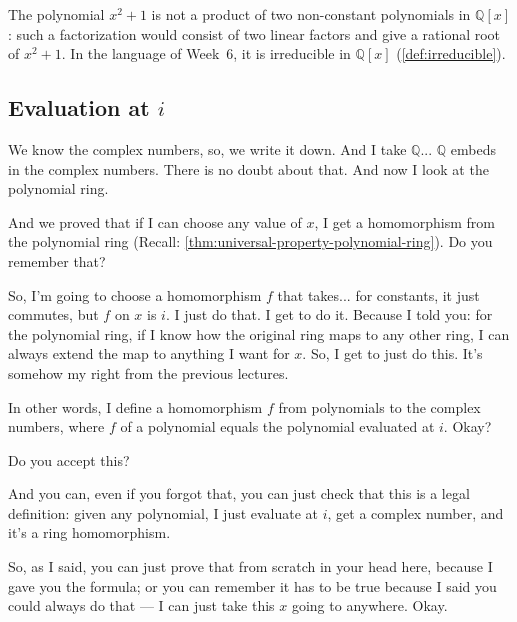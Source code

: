 \begin{aiNote}
The polynomial $x^2 + 1$ is not a product of two non-constant polynomials in $\mathbb{Q}[x]$: such a factorization would consist of two linear factors and give a rational root of $x^2 + 1$. In the language of Week~6, it is irreducible in $\mathbb{Q}[x]$ (\cref{def:irreducible}).
\end{aiNote}

\subsection{Evaluation at \texorpdfstring{$i$}{i}}

\begin{speech}[01:20:56 - 01:22:36]
We know the complex numbers, so, we write it down.  And I take $\mathbb{Q}$...  $\mathbb{Q}$ embeds in the complex numbers. There is no doubt about that. And now I look at the polynomial ring.  

And we proved that if I can choose any value of $x$, I get a homomorphism from the polynomial ring (Recall: \cref{thm:universal-property-polynomial-ring}). Do you remember that? 

So, I'm going to choose a homomorphism $f$ that takes... for constants, it just commutes, but $f$ on $x$ is $i$.  I just do that. I get to do it. Because I told you: for the polynomial ring, if I know how the original ring maps to any other ring, I can always extend the map to anything I want for $x$. So, I get to just do this. It's somehow my right from the previous lectures. 

In other words, I define a homomorphism $f$ from polynomials to the complex numbers,  where $f$ of a polynomial equals the polynomial evaluated at $i$.  Okay? 

Do you accept this? 

And you can, even if you forgot that, you can just check that this is a legal definition: given any polynomial, I just evaluate at $i$, get a complex number, and it's a ring homomorphism.  

So, as I said, you can just prove that from scratch in your head here, because I gave you the formula; or you can remember it has to be true because I said you could always do that --- I can just take this $x$ going to anywhere. Okay.
\end{speech}

